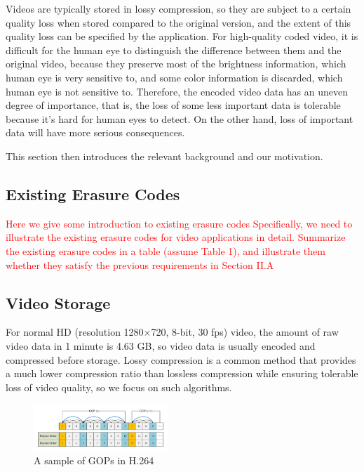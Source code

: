 \documentclass[sigconf]{acmart}
\begin{document}
Videos are typically stored in lossy compression, so they are subject to a certain quality loss when stored compared to the original version, and the extent of this quality loss can be specified by the application. For high-quality coded video, it is difficult for the human eye to distinguish the difference between them and the original video, because they preserve most of the brightness information, which human eye is very sensitive to, and some color information is discarded, which human eye is not sensitive to. Therefore, the encoded video data has an uneven degree of importance, that is, the loss of some less important data is tolerable because it's hard for human eyes to detect. On the other hand, loss of important data will have more serious consequences.

This section then introduces the relevant background and our motivation.

\subsection{Existing Erasure Codes}

\textcolor{red}{Here we give some introduction to existing erasure codes
Specifically, we need to illustrate the existing erasure codes for video applications in detail.
Summarize the existing erasure codes in a table (assume Table 1), and illustrate them whether they satisfy the previous requirements in Section II.A}

\subsection{Video Storage}\label{video storage}
For normal HD (resolution 1280$\times$720, 8-bit, 30 fps) video, the amount of raw video data in 1 minute is 4.63 GB, so video data is usually encoded and compressed before storage. Lossy compression is a common method that provides a much lower compression ratio than lossless compression while ensuring tolerable loss of video quality, so we focus on such algorithms.

\begin{figure}[ht]
\centering
\includegraphics[width=0.45\textwidth]{photo/H264_IPB.pdf}
\caption{A sample of GOPs in H.264}
\label{H264-IPB}
\end{figure}
\end{document}
